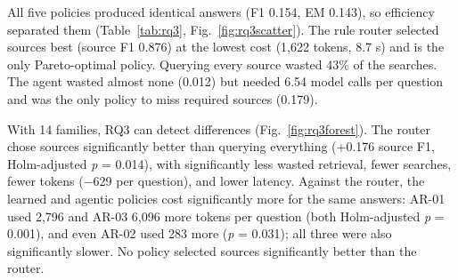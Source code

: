 \documentclass[conference]{IEEEtran}
\begin{document}
All five policies produced identical answers (F1 0.154, EM 0.143), so efficiency separated them (Table~\ref{tab:rq3}, Fig.~\ref{fig:rq3scatter}). The rule router selected sources best (source F1 0.876) at the lowest cost (1,622 tokens, 8.7 s) and is the only Pareto-optimal policy. Querying every source wasted 43\% of the searches. The agent wasted almost none (0.012) but needed 6.54 model calls per question and was the only policy to miss required sources (0.179).

With 14 families, RQ3 can detect differences (Fig.~\ref{fig:rq3forest}). The router chose sources significantly better than querying everything (+0.176 source F1, Holm-adjusted \emph{p} = 0.014), with significantly less wasted retrieval, fewer searches, fewer tokens ($-$629 per question), and lower latency. Against the router, the learned and agentic policies cost significantly more for the same answers: AR-01 used 2,796 and AR-03 6,096 more tokens per question (both Holm-adjusted \emph{p} = 0.001), and even AR-02 used 283 more (\emph{p} = 0.031); all three were also significantly slower. No policy selected sources significantly better than the router.
\end{document}
